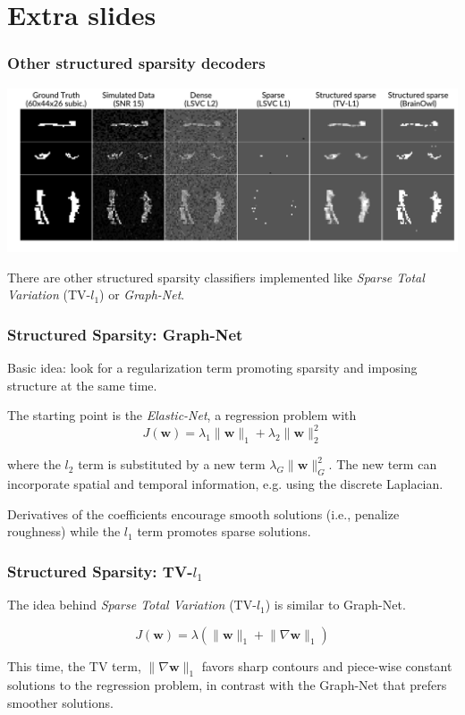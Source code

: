 \documentclass[11pt]{beamer}
\begin{document}
\section{Extra slides}
\begin{frame}[t]
    \frametitle{Other structured sparsity decoders}
    
    \vspace*{-1cm} 

    \begin{center}
        \includegraphics[scale=0.35]{figures/template_and_weights_4_clfs.png}
    \end{center}

    There are other structured sparsity classifiers implemented like
    \emph{Sparse Total Variation} (TV-$l_1$) or
    \emph{Graph-Net}.

\end{frame}
\begin{frame}[t,shrink]
  \frametitle{Structured Sparsity: Graph-Net}
  Basic idea: look for a regularization term promoting sparsity and imposing
  structure at the same time.

  The starting point is the \emph{Elastic-Net}, a regression problem with
  \[J(\mathbf{w}) = \lambda_{1}\lVert{\mathbf{w}}\rVert_{1} + 
    \lambda_{2}\lVert{\mathbf{w}}\rVert_{2}^{2}\]

  where the \(l_{2}\) term is substituted by a new term
  \(\lambda_{G}\lVert{\mathbf{w}}\rVert_{G}^{2}\). The new term can incorporate
  spatial and temporal information, e.g. using the discrete Laplacian.

  Derivatives of the coefficients encourage smooth solutions
  (i.e., penalize roughness) while the $l_{1}$ term promotes sparse solutions. 

\end{frame}
\begin{frame}
  \frametitle{Structured Sparsity: TV-$l_1$}
  The idea behind \emph{Sparse Total Variation} (TV-$l_{1}$) is similar to
  Graph-Net. 

  \[J(\mathbf{w}) = \lambda \left( \lVert{\mathbf{w}}\rVert _{1} + 
   \lVert{\nabla\mathbf{w}}\rVert _{1}\right) \]

  This time, the TV term, $\lVert{\nabla\mathbf{w}}\rVert _{1}$ favors sharp
  contours and piece-wise constant solutions to the regression problem, in contrast
  with the Graph-Net that prefers smoother solutions.
\end{frame}
\end{document}
